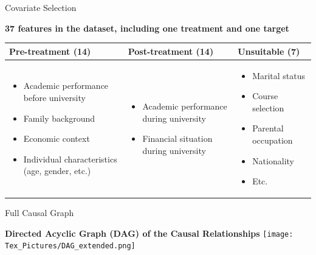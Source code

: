 \documentclass[aspectratio=169]{beamer}
\begin{document}
\begin{frame}{Covariate Selection}

	\textbf{37 features in the dataset, including one treatment and one target}
	\vspace{10pt}
	
	\begin{tabularx}{\textwidth}{X | X | X}
	\textbf{Pre-treatment (14)}  & \textbf{Post-treatment (14)} & \textbf{Unsuitable (7)} \\[0.5ex]
	\hline \hline 
	\parbox[t]{4cm}{\vspace{-8pt} \begin{itemize}
	[label=--,leftmargin=1.2em,itemsep=1pt,topsep=2pt]
    \item Academic performance before university
    \item Family background
    \item Economic context
    \item Individual characteristics (age, gender, etc.)
	\end{itemize}} 

	&
	\parbox[t]{4cm}{
	\vspace{-8pt}
	\begin{itemize}[label=--,leftmargin=1.2em,itemsep=1pt,topsep=2pt]
    	\item Academic performance during university
    	\item Financial situation during university
	\end{itemize}}
	&
	\parbox[t]{4cm}{\vspace{-8pt} 
	\begin{itemize}[label=--,leftmargin=1.2em,itemsep=1pt,topsep=2pt]
    	\item Marital status
    	\item Course selection
    	\item Parental occupation
    	\item Nationality
    	\item Etc.
	\end{itemize}} 
	\end{tabularx}


\end{frame}

\begin{frame}{Full Causal Graph}
	\begin{center}
	\textbf{Directed Acyclic Graph (DAG) of the Causal Relationships}
	\hspace*{-1cm}
     \texttt{[image: Tex\_Pictures/DAG\_extended.png]}
     \end{center}
\end{frame}
\end{document}
